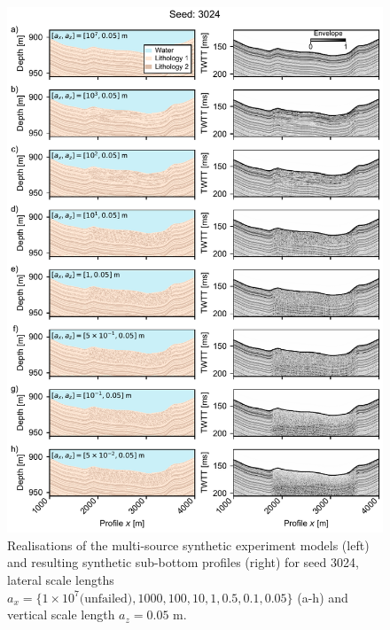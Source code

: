 \documentclass[se,manuscript]{copernicus}
\begin{document}
\begin{figure}
    \includegraphics{figures/si_fig07.pdf}
    \caption{Realisations of the multi-source synthetic experiment models (left) and resulting synthetic sub-bottom profiles (right) for seed 3024, lateral scale lengths $a_x=\{1 \times 10^7 \text{(unfailed)}, 1000, 100, 10, 1, 0.5, 0.1, 0.05\}$ (a-h) and vertical scale length $a_z=0.05$ m.}
    \label{fig:multi-source-3024}
\end{figure}
\end{document}
